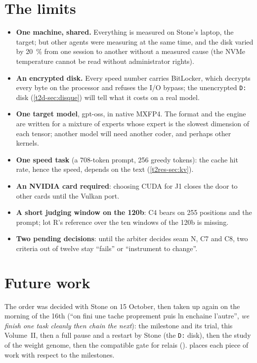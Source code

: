 \section{The limits}\label{t2d-sec:limites}

\begin{itemize}
\item \textbf{One machine, shared.} Everything is measured on Stone's laptop, the target; but other agents were measuring at the same time, and the disk varied by \SI{20}{\percent} from one session to another without a measured cause (the NVMe temperature cannot be read without administrator rights).
\item \textbf{An encrypted disk.} Every speed number carries BitLocker, which decrypts every byte on the processor and refuses the I/O bypass; the unencrypted \texttt{D:} disk (\cref{t2d-sec:disque}) will tell what it costs on a real model.
\item \textbf{One target model}, gpt-oss, in native MXFP4. The format and the engine are written for a mixture of experts whose expert is the slowest dimension of each tensor; another model will need another coder, and perhaps other kernels.
\item \textbf{One speed task} (a 708-token prompt, 256 greedy tokens): the cache hit rate, hence the speed, depends on the text (\cref{t2res-sec:kv}).
\item \textbf{An NVIDIA card required}: choosing CUDA for J1 closes the door to other cards until the Vulkan port.
\item \textbf{A short judging window on the 120b}: C4 bears on 255 positions and the prompt; lot R's reference over the ten windows of the 120b is missing.
\item \textbf{Two pending decisions}: until the arbiter decides seam N, C7 and C8, two criteria out of twelve stay ``fails'' or ``instrument to change''.
\end{itemize}

\section{Future work}\label{t2d-sec:futurs}

The order was decided with Stone on 15 October, then taken up again on the morning of the 16th (``on fini une tache proprement puis ln enchaine l'autre'', \emph{we finish one task cleanly then chain the next}): the milestone and its trial, this Volume~II, then a full pause and a restart by Stone (the \texttt{D:} disk), then the study of the weight genome, then the compatible gate for relais ().  places each piece of work with respect to the milestones.

